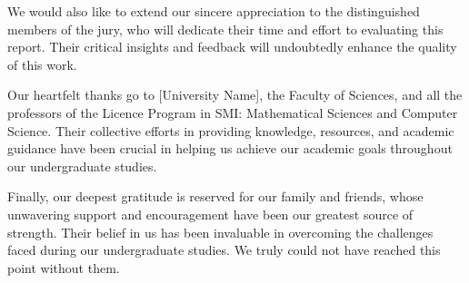 \documentclass[11pt, a4paper]{article}
\begin{document}
We would also like to extend our sincere appreciation to the distinguished members of the jury, who will dedicate their time and effort to evaluating this report. Their critical insights and feedback will undoubtedly enhance the quality of this work.

Our heartfelt thanks go to [University Name], the Faculty of Sciences, and all the professors of the Licence Program in SMI: Mathematical Sciences and Computer Science. Their collective efforts in providing knowledge, resources, and academic guidance have been crucial in helping us achieve our academic goals throughout our undergraduate studies.

Finally, our deepest gratitude is reserved for our family and friends, whose unwavering support and encouragement have been our greatest source of strength. Their belief in us has been invaluable in overcoming the challenges faced during our undergraduate studies. We truly could not have reached this point without them.

\newpage
\end{document}
